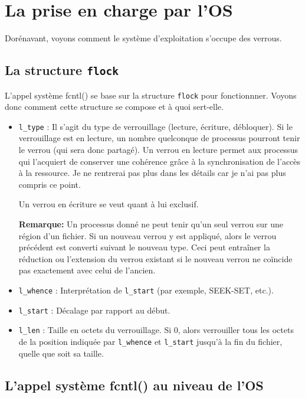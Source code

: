 \newpage
\section{La prise en charge par l'OS}

Dorénavant, voyons comment le système d'exploitation s'occupe des verrous.

\subsection{La structure \texttt{flock}}
L'appel système fcntl() se base sur la structure \texttt{flock} pour fonctionnner. Voyons donc comment cette structure se compose et à quoi sert-elle.

\begin{itemize}
    \item \texttt{l\_type} : Il s'agit du type de verrouillage (lecture, écriture, débloquer).
    \newline
    Si le verrouillage est en lecture, un nombre quelconque de processus pourront tenir le verrou (qui sera donc partagé). Un verrou en lecture permet aux processus qui l'acquiert de conserver une cohérence grâce à la synchronisation de l'accès à la ressource. Je ne rentrerai pas plus dans les détails car je n'ai pas plus compris ce point.
    
    Un verrou en écriture se veut quant à lui exclusif. 

    \textbf{Remarque:} 
    Un processus donné ne peut tenir qu'un seul verrou sur une région d'un fichier. Si un nouveau verrou y est appliqué, alors le verrou précédent est converti suivant le nouveau type. Ceci peut entraîner la réduction ou l'extension du verrou existant si le nouveau verrou ne coïncide pas exactement avec celui de l'ancien.
    
    \item \texttt{l\_whence} : Interprétation de \texttt{l\_start} (par exemple, SEEK-SET, etc.).
    
    \item \texttt{l\_start} : Décalage par rapport au début.
    
    \item \texttt{l\_len} : Taille en octets du verrouillage. Si 0, alors verrouiller tous les octets de la position indiquée par \texttt{l\_whence} et \texttt{l\_start} jusqu'à la fin du fichier, quelle que soit sa taille.
\end{itemize}

\subsection{L'appel système fcntl() au niveau de l'OS\cite{ManFnctl}}

